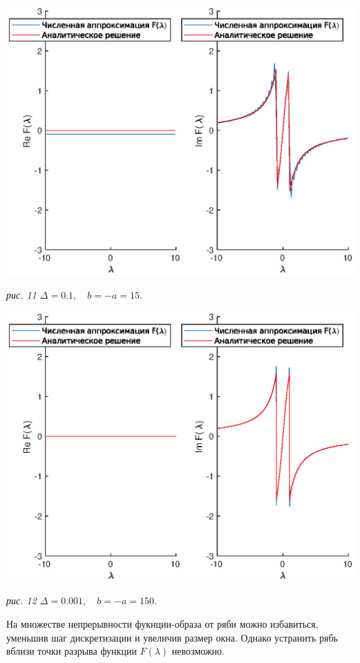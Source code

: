 \documentclass[11pt]{article}
\begin{document}
\includegraphics[width=1.0\textwidth]{ripple_1.eps}
\begin{center}
\it{рис. 11 \quad $\Delta = 0.1, \quad b = -a = 15.$}
\end{center}

\includegraphics[width=1.0\textwidth]{ripple_2.eps}
\begin{center}
\it{рис. 12 \quad $\Delta = 0.001, \quad b = -a = 150.$}
\end{center}

На множестве непрерывности фукнции-образа от ряби можно избавиться, уменьшив шаг дискретизации и
увеличив размер окна. Однако устранить рябь вблизи точки разрыва функции $F(\lambda)$ невозможно.
\end{document}
